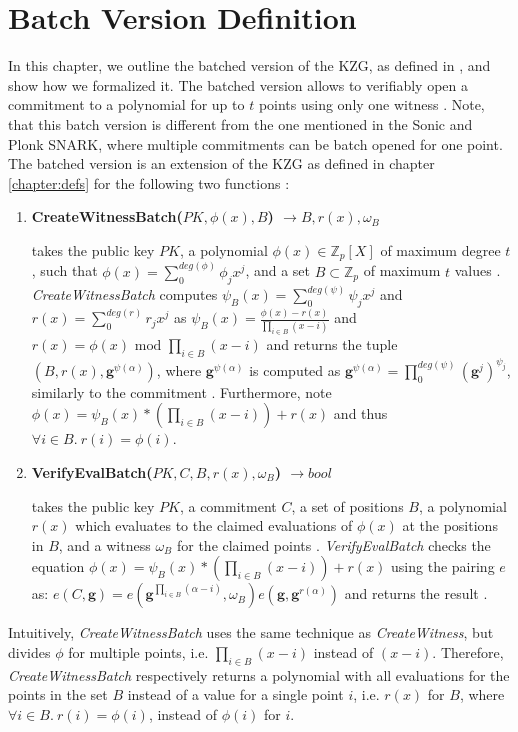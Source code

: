\chapter{Batch Version Definition}\label{chapter:batch_def}

In this chapter, we outline the batched version of the KZG, as defined in \parencite{KZG}, and show how we formalized it.
The batched version allows to verifiably open a commitment to a polynomial for up to $t$ points using only one witness \parencite{KZG}. Note, that this batch version is different from the one mentioned in the Sonic\parencite{sonic} and Plonk\parencite{plonk} SNARK, where multiple commitments can be batch opened for one point. The \parencite{KZG} batched version is an extension of the KZG as defined in chapter \ref{chapter:defs} for the following two functions \parencite{KZG}: 
\begin{enumerate}
    \item \textbf{CreateWitnessBatch($PK,\phi(x),B$) $\rightarrow B,r(x),\omega_B$}
    
    takes the public key $PK$, a polynomial $\phi(x) \in \mathbb{Z}_p[X]$ of maximum degree $t$, such that $\phi(x)=\sum_{0}^{deg(\phi)}\phi_jx^j$, and a set $B\subset\mathbb{Z}_p$ of maximum $t$ values \parencite{KZG}. \textit{CreateWitnessBatch} computes $\psi_B(x)=\sum_{0}^{deg(\psi)}\psi_jx^j$ and $r(x)=\sum_{0}^{deg(r)}r_jx^j$ as $\psi_B(x)=\frac{\phi(x)-r(x)}{\prod_{i\in B}^{}(x-i)}$ and $r(x)= \phi(x) \text{ mod } \prod_{i\in B}^{}(x-i)$ and returns the tuple $(B,r(x),\mathbf{g}^{\psi(\alpha)})$, where $\mathbf{g}^{\psi(\alpha)}$ is computed as $\mathbf{g}^{\psi(\alpha)} = \prod_{0}^{deg(\psi)}(\mathbf{g}^j)^{\psi_j}$, similarly to the commitment \parencite{KZG}. Furthermore, note $\phi(x)=\psi_B(x)*(\prod_{i\in B}^{}(x-i)) + r(x)$ and thus $\forall i\in B.\ r(i)=\phi(i)$.

    \item \textbf{VerifyEvalBatch($PK,C,B,r(x),\omega_B$) $\rightarrow bool$}
    
    takes the public key $PK$, a commitment $C$, a set of positions $B$, a polynomial $r(x)$ which evaluates to the claimed evaluations of $\phi(x)$ at the positions in $B$, and a witness $\omega_B$ for the claimed points \parencite{KZG}. \textit{VerifyEvalBatch} checks the equation $\phi(x)=\psi_B(x)*(\prod_{i\in B}^{}(x-i)) + r(x)$ using the pairing $e$ as: $e(C,\mathbf{g}) = e(\mathbf{g}^{\prod_{i\in B}^{}(\alpha-i)}, \omega_B)e(\mathbf{g},\mathbf{g}^{r(\alpha)})$ and returns the result \parencite{KZG}.


\end{enumerate}
Intuitively, \textit{CreateWitnessBatch} uses the same technique as \textit{CreateWitness}, but divides $\phi$ for multiple points, i.e. $\prod_{i\in B}^{}(x-i)$ instead of $(x-i)$. Therefore, \textit{CreateWitnessBatch} respectively returns a polynomial with all evaluations for the points in the set $B$ instead of a value for a single point $i$, i.e. $r(x)$ for $B$, where $\forall i\in B.\ r(i)=\phi(i)$, instead of $\phi(i)$ for $i$.

